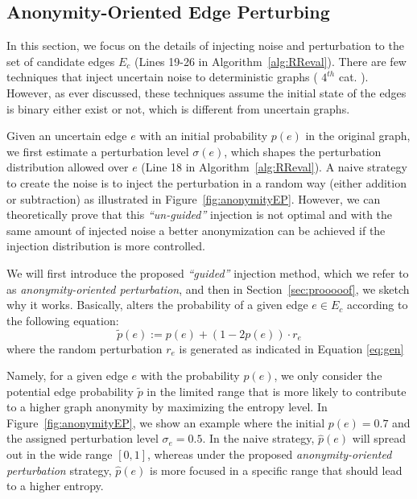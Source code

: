 \subsection{Anonymity-Oriented Edge Perturbing}
\label{sec:perturbation}

In this section, we focus on the details of injecting noise and perturbation to the set of candidate edges $E_c$ (Lines 19-26 in Algorithm~\ref{alg:RReval}). There are few techniques that inject uncertain noise to deterministic graphs ( $4^{th}$ cat. \cite{Boldi_Injecting_2012, Nguyen_Anonymizing_2015, Mittal_Preserving_2013}). However, as ever discussed, these techniques assume the initial state of the edges is binary either exist or not, which is different from uncertain graphs.   

Given an uncertain edge $e$ with an initial probability $p(e)$ in the original graph, we first estimate a perturbation level $\sigma(e)$, 
which shapes the perturbation distribution allowed over $e$ (Line 18 in Algorithm~\ref{alg:RReval}).
A naive strategy to create the noise is to inject the perturbation in a random way (either addition or subtraction) as illustrated in Figure~\ref{fig:anonymityEP}. 
However, we can theoretically prove that this {\em ``un-guided''} injection is not optimal and with the same amount of injected noise a better anonymization can be achieved 
if the injection distribution is more controlled. 

We will first introduce the proposed {\em ``guided''} injection method, which we refer to as {\em anonymity-oriented perturbation}, and then in Section~\ref{sec:prooooof}, we sketch why it works.
Basically, \SysName alters the probability of a given edge $e \in E_{c}$ according to the following equation:
\begin{equation*}
    \tilde{\mathit{p}}(e):=\mathit{p}(e) + (1-2 \mathit{p}(e)) \cdot r_{e} 
\end{equation*} 
where the random perturbation $r_{e}$ is generated as indicated in Equation \ref{eq:gen} 

Namely, for a given edge $e$ with the probability $p(e)$, we only consider the potential edge probability $\tilde{p}$ in the limited range that 
is more likely to contribute to a higher graph anonymity by maximizing the entropy level. 
In Figure~\ref{fig:anonymityEP}, we show an example where the initial $p(e)=0.7$ and the assigned perturbation level $\sigma_{e}=0.5$. 
In the naive strategy, $\hat{p}(e)$ will spread out in the wide range $[0,1]$, whereas under the 
proposed {\em anonymity-oriented perturbation} strategy,  $\hat{p}(e)$ is more focused in a specific range that should lead to a higher entropy.

